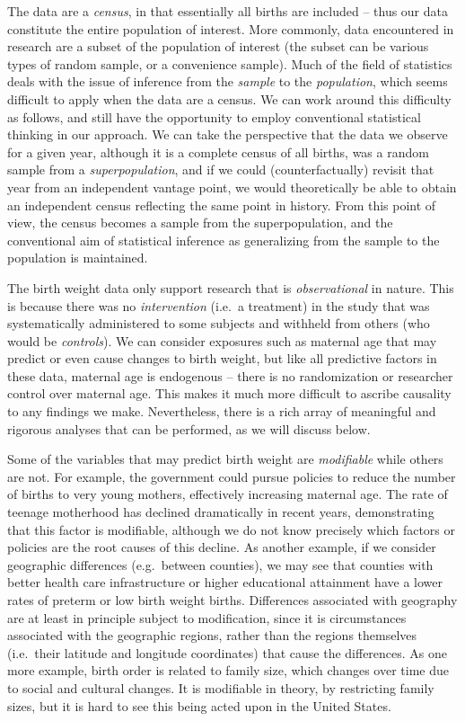 The data are a {\em census}, in that essentially all births are included -- thus our data constitute the entire population of interest. More commonly, data encountered in research are a subset of the population of interest (the subset can be various types of random sample, or a convenience sample).  Much of the field of statistics deals with the issue of inference from the {\em sample} to the {\em population}, which seems difficult to apply when the data are a census.  We can work around this difficulty as follows, and still have the opportunity to employ conventional statistical thinking in our approach.  We can take the perspective that the data we observe for a given year, although it is a complete census of all births, was a random sample from a {\em superpopulation}, and if we could (counterfactually) revisit that year from an independent vantage point, we would theoretically be able to obtain an independent census reflecting the same point in history.  From this point of view, the census becomes a sample from the superpopulation, and the conventional aim of statistical inference as generalizing from the sample to the population is maintained.

The birth weight data only support research that is {\em observational} in nature.  This is because there was no {\em intervention} (i.e.\ a treatment) in the study that was systematically administered to some subjects and withheld from others (who would be {\em controls}).  We can consider exposures such as maternal age that may predict or even cause changes to birth weight, but like all predictive factors in these data, maternal age is endogenous -- there is no randomization or researcher control over maternal age.  This makes it much more difficult to ascribe causality to any findings we make.  Nevertheless, there is a rich array of meaningful and rigorous analyses that can be performed, as we will discuss below.

Some of the variables that may predict birth weight are {\em modifiable} while others are not.  For example, the government could pursue policies to reduce the number of births to very young mothers, effectively increasing maternal age. The rate of teenage motherhood has declined dramatically in recent years, demonstrating that this factor is modifiable, although we do not know precisely which factors or policies are the root causes of this decline.  As another example, if we consider geographic differences (e.g.\ between counties), we may see that counties with better health care infrastructure or higher educational attainment have a lower rates of preterm or low birth weight births.  Differences associated with geography are at least in principle subject to modification, since it is circumstances associated with the geographic regions, rather than the regions themselves (i.e.\ their latitude and longitude coordinates) that cause the differences.  As one more example, birth order is related to family size, which changes over time due to social and cultural changes.  It is modifiable in theory, by restricting family sizes, but it is hard to see this being acted upon in the United States.

